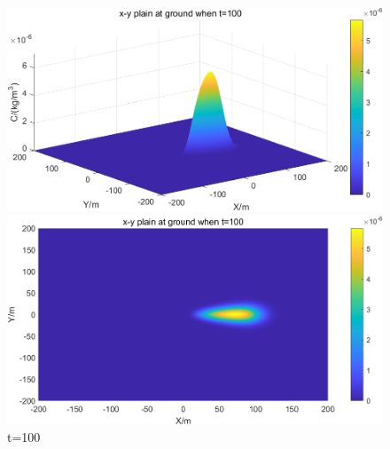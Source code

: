 \documentclass{article}
\begin{document}
	\begin{figure}[htbp]
		\begin{minipage}{0.49\textwidth}
			\includegraphics[width=\textwidth]{pics/default,t=100,3D.png}
		\end{minipage}
		\begin{minipage}{0.49\textwidth}
			\includegraphics[width=\textwidth]{pics/default,t=100,2D.png}
		\end{minipage}
		\caption{t=100}
		\label{fig2}
	\end{figure}
	
\end{document}
